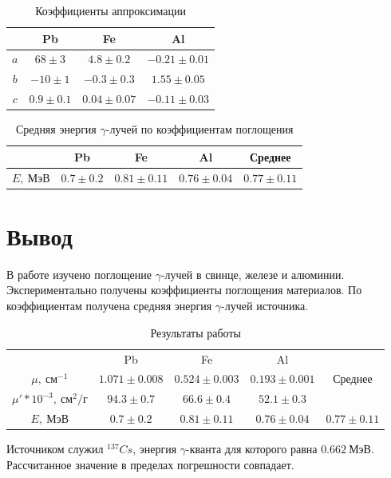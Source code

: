 \documentclass[a4paper, 12pt]{article}
\begin{document}
            \begin{table}[!ht]
                \centering
                \begin{tabular}{|c|c|c|c|}
                    \hline

                     & Pb & Fe & Al\\ \hline
                    $a$ & $68 \pm 3$ & $4.8 \pm 0.2$ & $-0.21 \pm 0.01$\\ \hline
                    $b$ & $-10 \pm 1$ & $-0.3 \pm 0.3$ & $1.55 \pm 0.05$\\ \hline
                    $c$& $0.9 \pm 0.1$ & $0.04 \pm 0.07$ & $-0.11 \pm 0.03$\\ \hline

                \end{tabular}
                \caption{Коэффициенты аппроксимации}
                \label{tab:approx_coeffs}
            \end{table}

            \begin{table}[!ht]
                \centering
                \begin{tabular}{|c|c|c|c|c|}
                    \hline

                     & Pb & Fe & Al & Среднее\\ \hline
                    $E,~МэВ$ & $0.7 \pm 0.2$ & $0.81 \pm 0.11$ & $0.76 \pm 0.04$ & $0.77 \pm 0.11$\\ \hline

                \end{tabular}
                \caption{Средняя энергия $\gamma$-лучей по коэффициентам поглощения}
                \label{tab:E}
            \end{table}

    \section{Вывод}

        В работе изучено поглощение $\gamma$-лучей в свинце, железе и алюминии. Экспериментально получены коэффициенты поглощения материалов. По коэффициентам получена средняя энергия $\gamma$-лучей источника.

        \begin{table}[!ht]
            \centering
            \begin{tabular}{|c|c|c|c|c|}
                \hline

                 & Pb & Fe & Al & \multirow{3}{*}{Среднее}\\ \cline{1-4}
                $\mu,~см^{-1}$ & $1.071 \pm 0.008$ & $0.524 \pm 0.003$ & $0.193 \pm 0.001$ &\\ \cline{1-4}
                $\mu'*10^{-3},~см^2/г$ & $94.3 \pm 0.7$ & $66.6 \pm 0.4$ & $52.1 \pm 0.3$ &\\ \hline
                $E,~МэВ$ & $0.7 \pm 0.2$ & $0.81 \pm 0.11$ & $0.76 \pm 0.04$ & $0.77 \pm 0.11$\\ \hline

            \end{tabular}
            \caption{Результаты работы}
            \label{tab:res}
        \end{table}

        Источником служил $^{137}Cs$, энергия $\gamma$-кванта для которого равна $0.662~МэВ$. Рассчитанное значение в пределах погрешности совпадает.
\end{document}
